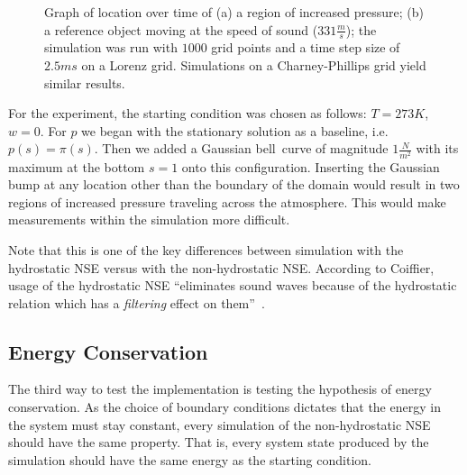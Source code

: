 \begin{figure}[!h]
    \caption{Graph of location over time of (a) a region of increased pressure; (b) a reference object moving at the speed of sound ($331\frac{m}{s}$);
    the simulation was run with $1000$ grid points and a time step size of $2.5ms$ on a Lorenz grid. Simulations on a Charney-Phillips grid yield similar results.}
    \label{fig:sound_speed}
\end{figure}

For the experiment, the starting condition was chosen as follows: $T=273K$, $w=0$.
For $p$ we began with the stationary solution as a baseline, i.e. $p(s)=\pi (s)$.
Then we added a Gaussian bell~curve of magnitude $1\frac{N}{m^2}$ with its maximum at the bottom $s=1$ onto this configuration.
Inserting the Gaussian bump at any location other than the boundary of the domain would result in two regions of increased pressure traveling across the atmosphere.
This would make measurements within the simulation more difficult.

Note that this is one of the key differences between simulation with the hydrostatic NSE versus with the non-hydrostatic NSE.
According to Coiffier, usage of the hydrostatic NSE ``eliminates sound waves because of the hydrostatic relation which has a \emph{filtering} effect on them''~\cite{coiffier2011fundamentals}.

\subsection{Energy Conservation}\label{sec:energy_conservation_test}
The third way to test the implementation is testing the hypothesis of energy conservation.
As the choice of boundary conditions dictates that the energy in the system must stay constant, every simulation of the non-hydrostatic NSE should have the same property.
That is, every system state produced by the simulation should have the same energy as the starting condition.

